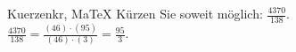 \begin{MAufgabe}{Kuerzen}{kr, MaTeX}
K\"urzen Sie soweit m\"oglich: $\frac{4370}{138}$.\\ 
\ifLsg\MLoesung
\quad $\frac{4370}{138}=\frac{(46)\cdot(95)}{(46)\cdot(3)}=\frac{95}{3}$.\else\relax\fi
 \end{MAufgabe}